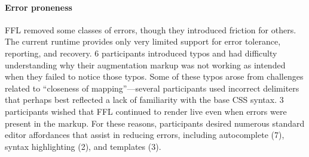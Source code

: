 


\paragraph{Error proneness}

FFL removed some classes of errors, though they introduced friction for others. The current runtime provides only very limited support for error tolerance, reporting, and recovery. 6 participants introduced typos and had difficulty understanding why their augmentation markup was not working as intended when they failed to notice those typos.
Some of these typos arose from challenges related to ``closeness of mapping''---several participants used incorrect delimiters that perhaps best reflected a lack of familiarity with the base CSS syntax. 3 participants wished that FFL continued to render live even when errors were present in the markup. For these reasons, participants desired numerous standard editor affordances that assist in reducing errors, including autocomplete (7), syntax highlighting (2), and templates (3).

